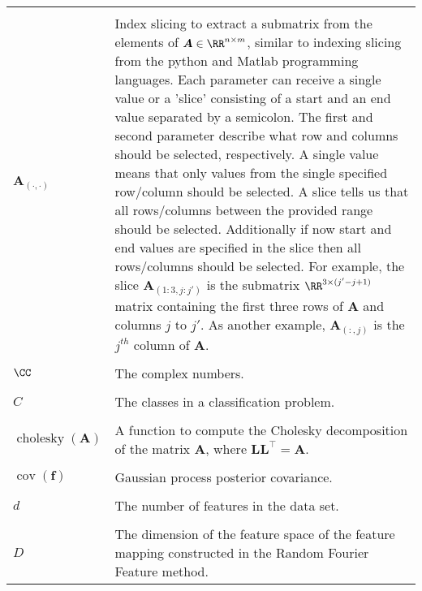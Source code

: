 \begin{longtable}{lp{}}
    \\\\
    $\bm{A}_{(\cdot,\cdot)}$                                                                                   & Index slicing to extract a submatrix from the elements of $\bm{A} \in \RR^{n \times m}$, similar to indexing slicing from the python and Matlab programming languages. Each parameter can receive a single value or a 'slice' consisting of a start and an end value separated by a semicolon. The first and second parameter describe what row and columns should be selected, respectively. A single value means that only values from the single specified row/column should be selected. A slice tells us that all rows/columns between the provided range should be selected. Additionally if now start and end values are specified in the slice then all rows/columns should be selected. For example, the slice $\bm{A}_{(1:3,j:j')}$ is the submatrix $\RR^{3 \times (j' - j + 1)}$ matrix containing the first three rows of $\bm{A}$ and columns $j$ to $j'$. As another example, $\bm{A}_{(:,j)}$ is the $j^{th}$ column of $\bm{A}$.
    \\\\
    $\CC$                                                                                                      & The complex numbers.
    \\\\
    $C$                                                                                                        & The classes in a classification problem.
    \\\\
    $\operatorname{cholesky} \left( \bm{A} \right)$                                                            & A function to compute the Cholesky decomposition of the matrix $\bm{A}$, where $\bm{L} \bm{L}^{\intercal} = \bm{A}$.
    \\\\
    $\operatorname{cov} \left( \bm{f} \right)$                                                                 & Gaussian process posterior covariance.
    \\\\
    $d$                                                                                                        & The number of features in the data set.
    \\\\
    $D$                                                                                                        & The dimension of the feature space of the feature mapping constructed in the Random Fourier Feature method.

\end{longtable}
